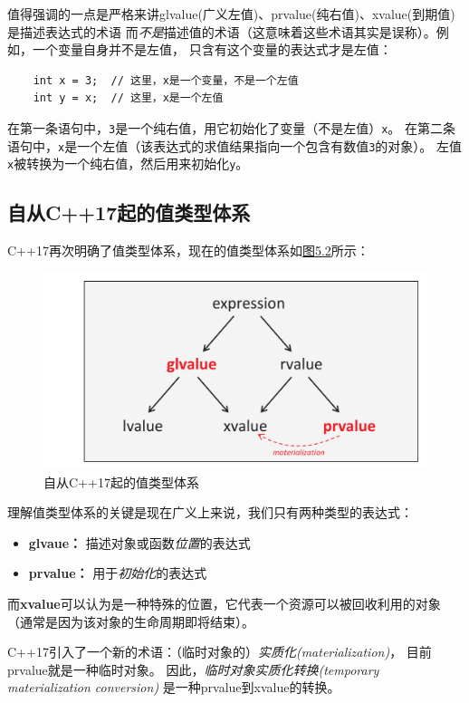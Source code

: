 值得强调的一点是严格来讲glvalue(广义左值)、prvalue(纯右值)、xvalue(到期值)是描述表达式的术语
而\emph{不是}描述值的术语（这意味着这些术语其实是误称）。例如，一个变量自身并不是左值，
只含有这个变量的表达式才是左值：
\begin{lstlisting}
    int x = 3;  // 这里，x是一个变量，不是一个左值
    int y = x;  // 这里，x是一个左值
\end{lstlisting}
在第一条语句中，\texttt{3}是一个纯右值，用它初始化了变量（不是左值）\texttt{x}。
在第二条语句中，\texttt{x}是一个左值（该表达式的求值结果指向一个包含有数值\texttt{3}的对象）。
左值\texttt{x}被转换为一个纯右值，然后用来初始化\texttt{y}。

\subsection{自从C++17起的值类型体系}
C++17再次明确了值类型体系，现在的值类型体系如\hyperref[f5.2]{图5.2}所示：

\begin{figure}[htb]
    \begin{center}
        \includegraphics[scale=0.8]{../imgs/05.2.png}
        \caption{自从C++17起的值类型体系}
        \label{f5.2}
    \end{center}
\end{figure}

理解值类型体系的关键是现在广义上来说，我们只有两种类型的表达式：
\begin{itemize}
    \item \textbf{glvaue：} 描述对象或函数\emph{位置}的表达式
    \item \textbf{prvalue：} 用于\emph{初始化}的表达式
\end{itemize}
而\textbf{xvalue}可以认为是一种特殊的位置，它代表一个资源可以被回收利用的对象
（通常是因为该对象的生命周期即将结束）。

C++17引入了一个新的术语：（临时对象的）\emph{实质化(materialization)}，
目前prvalue就是一种临时对象。
因此，\emph{临时对象实质化转换(temporary materialization conversion)}
是一种prvalue到xvalue的转换。

